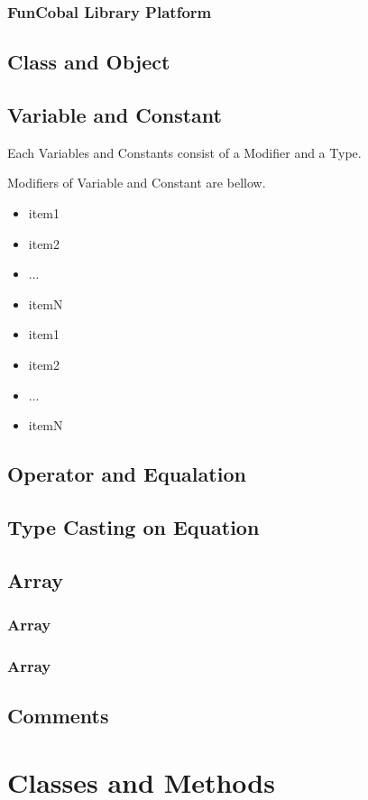 \documentclass{jarticle}
\begin{document}
\subsubsection{FunCobal Library Platform}
\newpage
\subsection{Class and Object}
\subsection{Variable and Constant}
Each Variables and Constants consist of a Modifier and a Type.
\par
Modifiers of Variable and Constant are bellow.
\begin{itemize}
  \item item1
  \item item2
  \item ...
  \item itemN
\end{itemize}

\begin{itemize}
  \item item1
  \item item2
  \item ...
  \item itemN
\end{itemize}
\subsection{Operator and Equalation}
\subsection{Type Casting on Equation}
\subsection{Array}
\subsubsection{Array}
\subsubsection{Array}
\subsection{Comments}
\newpage
\section{Classes and Methods}
\end{document}
